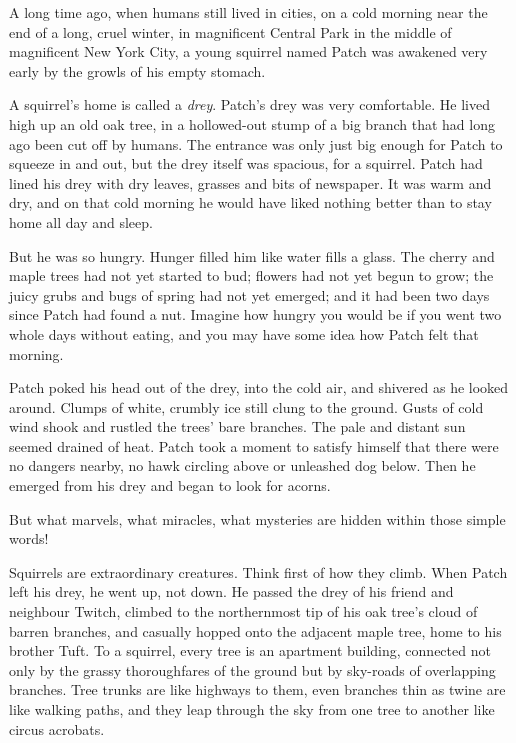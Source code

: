 \documentclass[12pt]{book}
\begin{document}
 A long time ago, when humans still lived in cities, on a cold morning near the end of a long, cruel winter, in magnificent Central Park in the middle of magnificent New York City, a young squirrel named Patch was awakened very early by the growls of his empty stomach.\par
 A squirrel's home is called a {\it drey}. Patch's drey was very comfortable. He lived high up an old oak tree, in a hollowed-out stump of a big branch that had long ago been cut off by humans. The entrance was only just big enough for Patch to squeeze in and out, but the drey itself was spacious, for a squirrel. Patch had lined his drey with dry leaves, grasses and bits of newspaper. It was warm and dry, and on that cold morning he would have liked nothing better than to stay home all day and sleep.\par
But he was so hungry. Hunger filled him like water fills a glass. The cherry and maple trees had not yet started to bud; flowers had not yet begun to grow; the juicy grubs and bugs of spring had not yet emerged; and it had been two days since Patch had found a nut. Imagine how hungry you would be if you went two whole days without eating, and you may have some idea how Patch felt that morning.\par
 Patch poked his head out of the drey, into the cold air, and shivered as he looked around. Clumps of white, crumbly ice still clung to the ground. Gusts of cold wind shook and rustled the trees' bare branches. The pale and distant sun seemed drained of heat. Patch took a moment to satisfy himself that there were no dangers nearby, no hawk circling above or unleashed dog below. Then he emerged from his drey and began to look for acorns.\par
But what marvels, what miracles, what mysteries are hidden within those simple words!\par
Squirrels are extraordinary creatures. Think first of how they climb. When Patch left his drey, he went up, not down. He passed the drey of his friend and neighbour Twitch, climbed to the northernmost tip of his oak tree's cloud of barren branches, and casually hopped onto the adjacent maple tree, home to his brother Tuft. To a squirrel, every tree is an apartment building, connected not only by the grassy thoroughfares of the ground but by sky-roads of overlapping branches. Tree trunks are like highways to them, even branches thin as twine are like walking paths, and they leap through the sky from one tree to another like circus acrobats.\par
\end{document}
